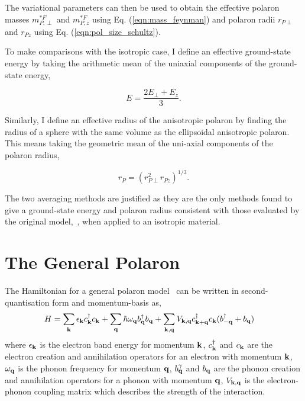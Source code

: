 The variational parameters can then be used to obtain the effective polaron masses $m^{*F}_{P,\perp}$ and $m^{*F}_{P, z}$ using Eq. (\ref{eqn:mass_feynman}) and polaron radii $r_{P\perp}$ and $r_{Pz}$ using Eq. (\ref{eqn:pol_size_schultz}). 

To make comparisons with the isotropic case, I define an effective ground-state energy by taking the arithmetic mean of the uniaxial components of the ground-state energy,

\begin{equation}
    E = \frac{2 E_\perp + E_z}{3}.
\end{equation}

Similarly, I define an effective radius of the anisotropic polaron by finding the radius of a sphere with the same volume as the ellipsoidal anisotropic polaron. This means taking the geometric mean of the uni-axial components of the polaron radius, 

\begin{equation}
    r_P = \left(r^2_{P\perp} r_{Pz}\right)^{1/3}.
\end{equation}

The two averaging methods are justified as they are the only methods found to give a ground-state energy and polaron radius consistent with those evaluated by the original model,~\cite{feynman_slow_1955}, when applied to an isotropic material.

\section{The General Polaron}
\label{sec:chap-third-fourth}

The Hamiltonian for a general polaron model~\cite{alexandrov_advances_2010} can be written in second-quantisation form and momentum-basis as,
\begin{equation}
    \begin{aligned}
        H &= \sum_{\vb{k}} \epsilon_{\vb{k}} c^\dagger_{\vb{k}} c_{\vb{k}} + \sum_{\vb{q}} \hbar \omega_{\vb{q}} b^\dagger_{\vb{q}} b_{\vb{q}} + \sum_{\vb{k},\vb{q}} V_{\vb{k}, \vb{q}} c^\dagger_{\vb{k}+\vb{q}} c_{\vb{k}} (b^\dagger_{\vb{-q}} + b_{\vb{q}})
    \end{aligned}
\end{equation} 
where $\epsilon_{\vb{k}}$ is the electron band energy for momentum $\vb{k}$, $c^\dagger_{\vb{k}}$ and $c_{\vb{k}}$ are the electron creation and annihilation operators for an electron with momentum $\vb{k}$, $\omega_{\vb{q}}$ is the phonon frequency for momentum $\vb{q}$, $b^\gamma_{\vb{q}}$ and $b_{\vb{q}}$ are the phonon creation and annihilation operators for a phonon with momentum $\vb{q}$, $V_{\vb{k}, \vb{q}}$ is the electron-phonon coupling matrix which describes the strength of the interaction.

